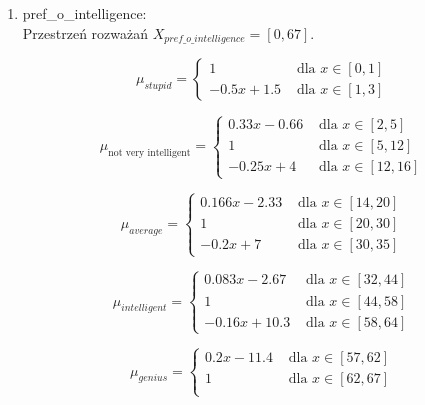\documentclass{classrep}
\begin{document}
\begin{enumerate}
  \item pref\_o\_intelligence:\\
  Przestrzeń rozważań $X_{pref\_o\_intelligence} = [0,67]$. 

  \begin{equation}
    \mu_{stupid} =
      \begin{cases}
        1 & \text{ dla } x \in [0 ,1] \\
        -0.5x+1.5 & \text{ dla } x \in [1,3]       
      \end{cases}  
  \end{equation}

  \begin{equation}
    \mu_{\text{not very intelligent}} =
      \begin{cases}
        0.33x-0.66 & \text{ dla } x \in [2,5]\\
        1 & \text{ dla } x \in [5,12] \\
        -0.25x+4 & \text{ dla } x \in [12,16]       
      \end{cases}  
  \end{equation}

  \begin{equation}
    \mu_{average} =
      \begin{cases}
        0.166x-2.33 & \text{ dla } x \in [14,20]\\
        1 & \text{ dla } x \in [20,30] \\
        -0.2x+7 & \text{ dla } x \in [30,35]       
      \end{cases}  
  \end{equation}

  \begin{equation}
    \mu_{intelligent} =
      \begin{cases}
        0.083x-2.67 & \text{ dla } x \in [32,44]\\
        1 & \text{ dla } x \in [44,58] \\
        -0.16x+10.3 & \text{ dla } x \in [58,64]       
      \end{cases}  
  \end{equation}

  \begin{equation}
    \mu_{genius} =
      \begin{cases}
        0.2x-11.4 & \text{ dla } x \in [57,62] \\
        1 & \text{ dla } x \in [62,67] \\   
      \end{cases}  
  \end{equation}
  

\end{enumerate}
\end{document}
